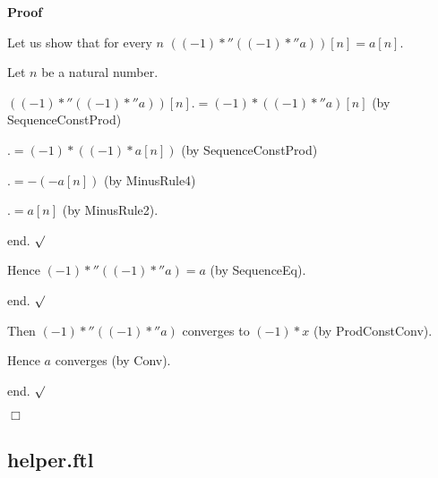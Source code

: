\documentclass{article}
\newenvironment{forthel}{\begin{leftbar}}{\end{leftbar}}
\newenvironment{proof}{\noindent\textbf{Proof\ }}{\hspace*{\fill}$\Box$\medskip}
\newenvironment{subproof}{\begin{list}{}{}
		\item[\text{Proof}]}{\hfill $\surd$ \end{list}}
\begin{document}
\begin{forthel}
\begin{proof}
\begin{subproof}
			\begin{subproof}
				Let us show that for every $n$ $((-1) *'' ((-1) *'' a))[n] = a[n]$.
				
				\begin{subproof}
					Let $n$ be a natural number.
					
					$((-1) *'' ((-1) *'' a))[n] .= (-1) * ((-1) *'' a)[n]$ (by SequenceConstProd)
					
					$.= (-1) * ((-1) * a[n])$ (by SequenceConstProd)
					
					$.= -(-a[n])$ (by MinusRule4)
					
					$.= a[n]$ (by MinusRule2).
					
					end.					
				\end{subproof}
				
				Hence $(-1) *'' ((-1) *'' a) = a$ (by SequenceEq).
				
				end.
			\end{subproof}
			
			Then $(-1) *'' ((-1) *'' a)$ converges to $(-1) * x$ (by ProdConstConv).
			
			Hence $a$ converges (by Conv).
			
			end.
		\end{subproof}
		
	\end{proof}


\end{forthel}

\subsection{helper.ftl}
\end{document}
